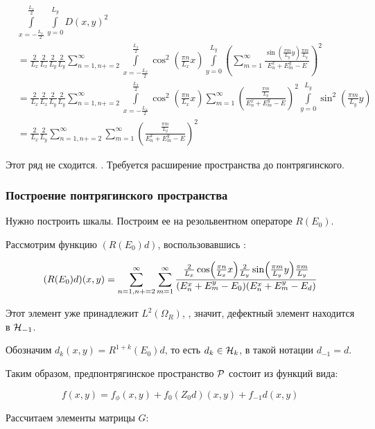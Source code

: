 \begin{align*}
& \int\limits_{x = -\frac{L_x}{2}}^{\frac{L_x}{2}} \int\limits_{y = 0}^{L_y} D(x, y)^2 \\
& = \frac{2}{L_x} \frac{2}{L_x} \frac{2}{L_y} \frac{2}{L_y}  \sum\limits_{n = 1, n += 2}^\infty
\int\limits_{x = -\frac{L_x}{2}}^{\frac{L_x}{2}} \cos^2(\frac{\pi n}{L_x} x) \int\limits_{y = 0}^{L_y}
\left( \sum\limits_{m = 1}^\infty \frac{\sin(\frac{\pi m}{L_y}y) \frac{\pi m}{L_y}}{E_n^x + E_m^y - E} \right)^2 \\
& = \frac{2}{L_x} \frac{2}{L_x} \frac{2}{L_y} \frac{2}{L_y}  \sum\limits_{n = 1, n += 2}^\infty
\int\limits_{x = -\frac{L_x}{2}}^{\frac{L_x}{2}} \cos^2(\frac{\pi n}{L_x} x)
\sum\limits_{m = 1}^\infty \left( \frac{\frac{\pi m}{L_y}}{E_n^x + E_m^y - E} \right)^2 \int\limits_{y = 0}^{L_y} \sin^2(\frac{\pi m}{L_y}y) \\
& = \frac{2}{L_x} \frac{2}{L_y}  \sum\limits_{n = 1, n += 2}^\infty
\sum\limits_{m = 1}^\infty \left( \frac{\frac{\pi m}{L_y}}{E_n^x + E_m^y - E} \right)^2
\end{align*}

Этот ряд не сходится. . Требуется расширение пространства до понтрягинского.

\subsubsection{Построение понтрягинского пространства}
Нужно построить шкалы. Построим ее на резольвентном операторе $R(E_0)$.

Рассмотрим функцию $(R(E_0) d)$, воспользовавшись :

\[
(R(E_0) d)(x, y)
= \sum\limits_{n = 1, n += 2}^\infty \sum\limits_{m = 1}^\infty \frac{\frac{2}{L_x} \cos(\frac{\pi n}{L_x} x) \frac{2}{L_y} \sin(\frac{\pi m}{L_y} y)\frac{\pi m}{L_y}}{(E^x_n + E^y_m - E_0)(E^x_n + E^y_m - E_d)} \\
\]

Этот элемент уже принадлежит $L^2(\Omega_R)$, , значит, дефектный элемент находится в $\mathcal{H}_{-1}$.

Обозначим $d_k(x, y) = R^{1 + k}(E_0) d$, то есть $d_k \in \mathcal{H}_{k}$, в такой нотации $d_{-1} = d$.

Таким образом, предпонтрягинское пространство $\mathcal{P}$ состоит из функций вида:

\[
f(x, y) = f_\phi(x, y) + f_0 (Z_0 d)(x, y) + f_{-1} d(x, y)
\]

Рассчитаем элементы матрицы $G$:

